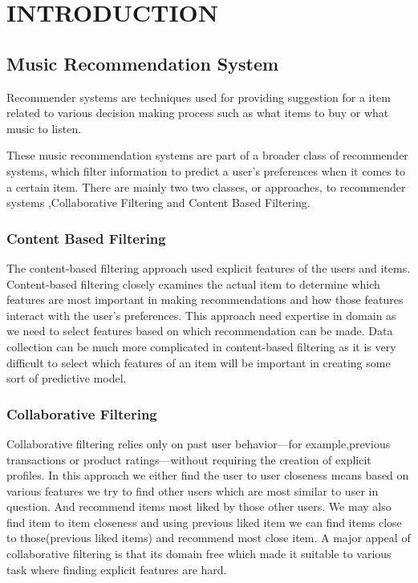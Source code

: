 \chapter{INTRODUCTION}\label{chap1}

\section{Music Recommendation System\cite{mainpaper}}
Recommender systems are techniques used for providing suggestion for a item related to various decision making process such as what items to buy or what music to listen.

These music recommendation systems are part of a broader class of recommender systems, which filter information to predict a user’s preferences when it comes to a certain item. There are mainly two  two classes, or approaches, to recommender systems ,Collaborative Filtering and Content Based Filtering.

\subsection{Content Based Filtering}
The content-based filtering approach used explicit features of the users and items. Content-based filtering closely examines the actual item to determine which features are most important in making recommendations and how those features interact with the user’s preferences. This approach need expertise in domain as we need to select features based on which recommendation can be made. Data collection can be much more complicated in content-based filtering as it is very difficult to select which features of an item will be important in creating some sort of predictive model.

\subsection{Collaborative Filtering}
Collaborative filtering relies only on past user behavior—for example,previous transactions or product ratings—without requiring the creation of explicit profiles. In this approach we either find the user to user closeness means based on various features we try to find other users which are most similar to user in question. And recommend items most liked by those other users. We may also find item to item closeness and using  previous liked item we can find items close to those(previous liked items) and recommend most close item. A major appeal of collaborative filtering is that its domain free which made it suitable to various task where finding explicit features are hard.

